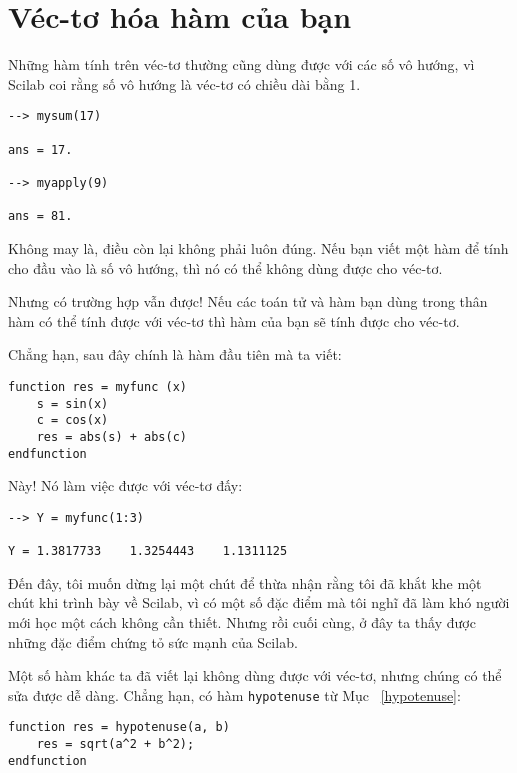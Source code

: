 \documentclass[12pt]{book}
\begin{document}
\section{Véc-tơ hóa hàm của bạn}

Những hàm tính trên véc-tơ thường cũng dùng được với các số
vô hướng, vì Scilab coi rằng số vô hướng là véc-tơ có chiều dài
bằng 1.

\begin{verbatim}
--> mysum(17)

ans = 17.

--> myapply(9)

ans = 81.
\end{verbatim}
%
Không may là, điều còn lại không phải luôn đúng. Nếu bạn viết
một hàm để tính cho đầu vào là số vô hướng, thì nó có thể không
dùng được cho véc-tơ.

Nhưng có trường hợp vẫn được! Nếu các toán tử và hàm bạn dùng
trong thân hàm có thể tính được với véc-tơ thì hàm của bạn sẽ
tính được cho véc-tơ.

Chẳng hạn, sau đây chính là hàm đầu tiên mà ta viết:

\begin{verbatim}
function res = myfunc (x)
    s = sin(x)
    c = cos(x)
    res = abs(s) + abs(c)
endfunction
\end{verbatim}
%
Này! Nó làm việc được với véc-tơ đấy:

\begin{verbatim}
--> Y = myfunc(1:3)

Y = 1.3817733    1.3254443    1.1311125
\end{verbatim}
%
Đến đây, tôi muốn dừng lại một chút để thừa nhận rằng tôi đã
khắt khe một chút khi trình bày về Scilab, vì có một số 
đặc điểm mà tôi nghĩ đã làm khó người mới học một cách
không cần thiết. Nhưng rồi cuối cùng, ở đây ta thấy được 
những đặc điểm chứng tỏ sức mạnh của Scilab.

Một số hàm khác ta đã viết lại không dùng được với véc-tơ, nhưng
chúng có thể sửa được dễ dàng. Chẳng hạn, có hàm 
{\tt hypotenuse} từ Mục~ \ref{hypotenuse}:

\begin{verbatim}
function res = hypotenuse(a, b)
    res = sqrt(a^2 + b^2);
endfunction
\end{verbatim}
%
%
\end{document}
